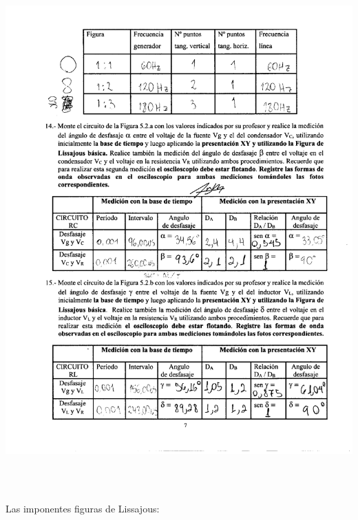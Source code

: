 \documentclass[12pt]{article}
\begin{document}
	\begin{center}
		\includegraphics[width=16cm,height=20cm]{Img/anexo_0005}
	\end{center}
	
	\newpage
	
	\noindent Las imponentes figuras de Lissajous:
	
\end{document}
